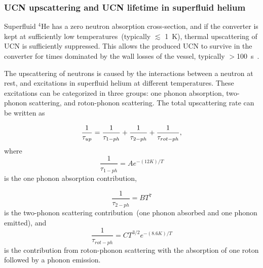

\subsubsection{UCN upscattering and UCN lifetime in superfluid helium~\label{sec:upscattering}}



Superfluid $^4$He has a zero neutron absorption cross-section, and if
the converter is kept at sufficiently low temperatures~(typically
$\lesssim$ 1~K), thermal upscattering of UCN is sufficiently
suppressed. This allows the produced UCN to survive in the converter
for times dominated by the wall losses of the vessel, typically
$>$100~s~\cite{Leung2016}.

The upscattering of neutrons is caused by the interactions between a
neutron at rest, and excitations in superfluid helium at different
temperatures. These excitations can be categorized in three groups:
one phonon absorption, two-phonon scattering, and roton-phonon
scattering. The total upscattering rate can be written as

\begin{equation}
\label{eqn:hE_{UCN}pscattering}
\frac{1}{\tau_{up}} =
\frac{1}{\tau_{1-ph}}+\frac{1}{\tau_{2-ph}}+\frac{1}{\tau_{rot-ph}},
\end{equation}
where 
\begin{equation}
\label{eqn:1ph}
\frac{1}{\tau_{1-ph}}= A e^{-(12 K)/T}
\end{equation}
is the one phonon absorption contribution, 

\begin{equation}
\label{eqn:2ph}
\frac{1}{\tau_{2-ph}}= BT^7
\end{equation}
is the two-phonon scattering contribution~(one phonon absorbed and one
phonon emitted), and
\begin{equation}
\label{eqn:ph-rtn}
\frac{1}{\tau_{rot-ph}}= CT^{3/2}e^{-(8.6 K)/T}
\end{equation}
is the contribution from roton-phonon scattering with the absorption
of one roton followed by a phonon emission.

